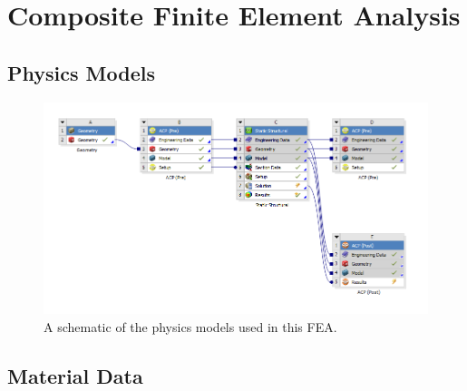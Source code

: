 \section{Composite Finite Element Analysis}

\subsection{Physics Models}

\begin{figure}[htp]
\centering
\includegraphics[width=1\textwidth]{./figures/fea/fea-project-schematic}
\caption{A schematic of the physics models used in this FEA.}
\label{fig:fea-project-schematic}
\end{figure}

\clearpage

\subsection{Material Data}

